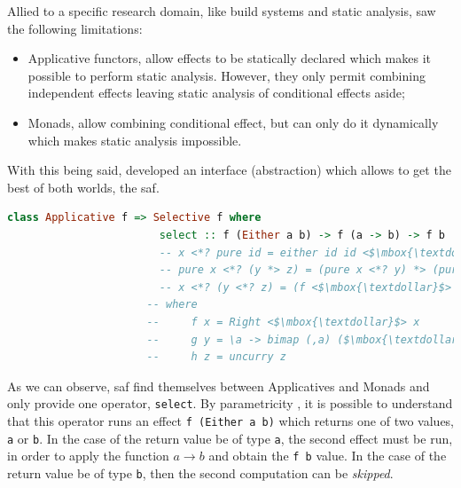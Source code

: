 \documentclass[
  oneside,
  11pt, a4paper,
  footinclude=true,
  headinclude=true,
  cleardoublepage=empty
]{scrbook}
\theoremstyle{definition}
\theoremstyle{definition}
\begin{document}
	Allied to a specific research domain, like build systems and static analysis, \cite{andrey2019selective} saw the following limitations:
	            
	            \begin{itemize}
	                \item Applicative functors, allow effects to be statically declared which makes it possible to perform static analysis. However, they only permit combining independent effects leaving static analysis of conditional effects aside;
	                \item Monads, allow combining conditional effect, but can only do it dynamically which makes static analysis impossible.
	            \end{itemize}{}
	            
	With this being said, \cite{andrey2019selective} developed an interface (abstraction) which allows to get the best of both worlds, the \gls{saf}.
	            
	            \begin{lstlisting}[mathescape, language=Haskell, label={lst:saf}, caption={Selective Applicative Functor laws},captionpos=b]
	                class Applicative f => Selective f where
	                    select :: f (Either a b) -> f (a -> b) -> f b
	                    -- x <*? pure id = either id id <$\mbox{\textdollar}$> x
	                    -- pure x <*? (y *> z) = (pure x <*? y) *> (pure x <*? z)
	                    -- x <*? (y <*? z) = (f <$\mbox{\textdollar}$> x) <*? (g <$\mbox{\textdollar}$> y) <*? (h <$\mbox{\textdollar}$> z)
                      -- where
                      --     f x = Right <$\mbox{\textdollar}$> x
                      --     g y = \a -> bimap (,a) ($\mbox{\textdollar}$a) y
                      --     h z = uncurry z
	            \end{lstlisting}{}
	            
	As we can observe, \gls{saf} find themselves between Applicatives and Monads and only provide one operator, \texttt{select}. By parametricity \citep{Wadler:1989:TF:99370.99404}, it is possible to understand that this operator runs an effect \texttt{f (Either a b)} which returns one of two values, \texttt{a} or \texttt{b}. In the case of the return value be of type \texttt{a}, the second effect must be run, in order to apply the function $a \rightarrow b$ and obtain the \texttt{f b} value. In the case of the return value be of type \texttt{b}, then the second computation can be \emph{skipped}.
	            
\end{document}
